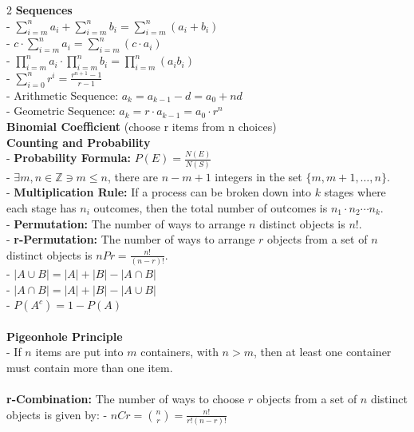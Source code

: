 \documentclass[10pt,letterpaper]{article}
\begin{document}
\begin{multicols}{2}
\textbf{Sequences}\\
- $\sum_{i=m}^{n} a_i + \sum_{i=m}^{n} b_i = \sum_{i=m}^{n}(a_i + b_i)$\\
- $c \cdot \sum_{i=m}^{n} a_i = \sum_{i=m}^{n}(c \cdot a_i)$\\
- $\prod_{i=m}^{n} a_i \cdot \prod_{i=m}^{n} b_i = \prod_{i=m}^{n}(a_ib_i)$\\
- $\sum_{i=0}^{n} r^i = \frac{r^{n+1} - 1}{r - 1}$\\
- Arithmetic Sequence: $a_k = a_{k-1} - d = a_0 + nd$\\
- Geometric Sequence: $a_k = r \cdot a_{k-1} = a_0 \cdot r^n$\\
\textbf{Binomial Coefficient} (choose r items from n choices)\\

\textbf{Counting and Probability}\\
- \textbf{Probability Formula:} $P(E) = \frac{N(E)}{N(S)}$ \\
- $\exists m, n \in \mathbb{Z} \ni m \leq n$, there are $n - m + 1$ integers in the set $\{m, m+1, \dots, n\}$.\\
- \textbf{Multiplication Rule:} If a process can be broken down into $k$ stages where each stage has $n_i$ outcomes,
then the total number of outcomes is $n_1 \cdot n_2 \cdots n_k$.\\
- \textbf{Permutation:} The number of ways to arrange $n$ distinct objects is $n!$.\\
- \textbf{r-Permutation:} The number of ways to arrange $r$ objects from a set of $n$ distinct objects is $nPr = \frac{n!}{(n-r)!}$.\\
- $|A \cup B| = |A| + |B| - |A \cap B|$\\
- $|A \cap B| = |A| + |B| - |A \cup B|$\\
- $P(A^c) = 1 - P(A)$\\
\\
\textbf{Pigeonhole Principle}\\
- If $n$ items are put into $m$ containers, with $n > m$, then at least one container must contain more than one item.\\
\\
\textbf{r-Combination:} The number of ways to choose $r$ objects from a set of $n$ distinct objects is given by:
- $nCr = \binom{n}{r} = \frac{n!}{r!(n-r)!}$\\

\vspace{9999pt}

\end{multicols}
\end{document}
